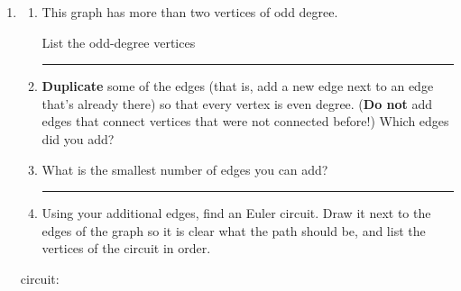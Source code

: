 \documentclass[12pt]{article}
\renewcommand{\emph}[1]{\textsf{\textbf{#1}}}
\newcommand{\ans}[1][1in]{\rule{#1}{.5pt}}
\newcommand{\be}{\begin{enumerate}}
\newcommand{\ee}{\end{enumerate}}
\begin{document}
\begin{enumerate}
\begin{tikzpicture}[baseline=(current bounding box.center), scale=.7]
\end{tikzpicture}

\bigskip

circuit/path: \hrulefill

\item 
\be
\item This graph has more than two vertices of odd degree. 

List the odd-degree vertices \ans
\item \emph{Duplicate} some of the edges (that is, add a new edge next to an edge that's already there) so that every vertex is even degree. (\emph{Do not} add edges that connect vertices that were not connected before!) Which edges did you add?

\hrulefill

\item  What is the smallest number of edges you can add?

\ans

\item Using your additional edges, find an Euler circuit. Draw it next to the edges of the graph so it is clear what the path should be, and list the vertices of the circuit in order.
\ee

\bigskip


\bigskip

circuit: \hrulefill

\end{enumerate}
\end{document}
